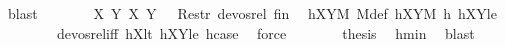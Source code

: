 \begin{isabellebody}
\ blast\isanewline
\ \ \ \ \isamarkupfalse%
\ \isamarkupfalse%
\ {\isachardoublequoteopen}{\isacharparenleft}{\kern0pt}{\isacharparenleft}{\kern0pt}{\isacharquery}{\kern0pt}X{}{\isacharcomma}{\kern0pt}\ {\isacharquery}{\kern0pt}Y{}{\isacharparenright}{\kern0pt}{\isacharcomma}{\kern0pt}\ {\isacharparenleft}{\kern0pt}X{\isacharcomma}{\kern0pt}\ Y{\isacharparenright}{\kern0pt}{\isacharparenright}{\kern0pt}\ {\isasymin}\ \ Restr\ devos{\isacharunderscore}{\kern0pt}rel\ {\isacharquery}{\kern0pt}fin{\isachardoublequoteclose}\ \isamarkupfalse%
\ hXYM\ M{\isacharunderscore}{\kern0pt}def\ hXY{}M\ h\ hXY{}le\ \isanewline
\ \ \ \ \ \ \ \ devos{\isacharunderscore}{\kern0pt}rel{\isacharunderscore}{\kern0pt}iff\ hX{}lt\ hXY{}le\ hcase\ \isamarkupfalse%
\ force\isanewline
\ \ \ \ \isamarkupfalse%
\ \isamarkupfalse%
\ {\isacharquery}{\kern0pt}thesis\ \isamarkupfalse%
\ hmin\ \isamarkupfalse%
\ blast\isanewline
\ \ \isamarkupfalse%
\isanewline
{}\isamarkupfalse%
%
\endisatagproof
{\isafoldproof}%
%
\isadelimproof
\isanewline
%
\endisadelimproof
%
\isadelimtheory
\isanewline
%
\endisadelimtheory
%
\isatagtheory
{}\isamarkupfalse%
%
\endisatagtheory
{\isafoldtheory}%
%
\isadelimtheory
%
\endisadelimtheory
%
\end{isabellebody}%
\endinput
